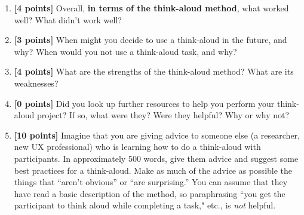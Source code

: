 \documentclass{article}
\begin{document}
\begin{enumerate}
    \item \textbf{[4 points]} Overall, \textbf{in terms of the think-aloud method}, what worked well? What didn't work well?
    
    \item \textbf{[3 points]} When might you decide to use a think-aloud in the future, and why? When would you not use a think-aloud task, and why?

    \item \textbf{[4 points]} What are the strengths of the think-aloud method? What are its weaknesses?

    \item \textbf{[0 points]} Did you look up further resources to help you perform your think-aloud project? If so, what were they? Were they helpful? Why or why not?

    \item \textbf{[10 points]} Imagine that you are giving advice to someone else (a researcher, new UX professional) who is learning how to do a think-aloud with participants. In approximately 500 words, give them advice and suggest some best practices for a think-aloud. Make as much of the advice as possible the things that ``aren't obvious'' or ``are surprising.'' You can assume that they have read a basic description of the method, so paraphrasing ``you get the participant to think aloud while completing a task," etc., is \textit{not} helpful.

\end{enumerate}
\end{document}
